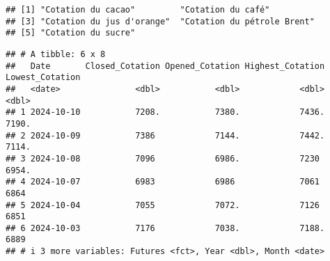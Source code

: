 \documentclass[
]{article}
\newenvironment{Shaded}{\begin{snugshade}}{\end{snugshade}}
\newcommand{\CommentTok}[1]{\textcolor[rgb]{0.56,0.35,0.01}{\textit{#1}}}
\newcommand{\FunctionTok}[1]{\textcolor[rgb]{0.13,0.29,0.53}{\textbf{#1}}}
\newcommand{\NormalTok}[1]{#1}
\newcommand{\OtherTok}[1]{\textcolor[rgb]{0.56,0.35,0.01}{#1}}
\newcommand{\SpecialCharTok}[1]{\textcolor[rgb]{0.81,0.36,0.00}{\textbf{#1}}}
\newcommand{\StringTok}[1]{\textcolor[rgb]{0.31,0.60,0.02}{#1}}
\begin{document}
\begin{Shaded}
\end{Shaded}

\begin{verbatim}
## [1] "Cotation du cacao"         "Cotation du café"         
## [3] "Cotation du jus d'orange"  "Cotation du pétrole Brent"
## [5] "Cotation du sucre"
\end{verbatim}

\begin{Shaded}
\end{Shaded}

\begin{verbatim}
## # A tibble: 6 x 8
##   Date       Closed_Cotation Opened_Cotation Highest_Cotation Lowest_Cotation
##   <date>               <dbl>           <dbl>            <dbl>           <dbl>
## 1 2024-10-10           7208.           7380.            7436.           7190.
## 2 2024-10-09           7386            7144.            7442.           7114.
## 3 2024-10-08           7096            6986.            7230            6954.
## 4 2024-10-07           6983            6986             7061            6864 
## 5 2024-10-04           7055            7072.            7126            6851 
## 6 2024-10-03           7176            7038.            7188.           6889 
## # i 3 more variables: Futures <fct>, Year <dbl>, Month <date>
\end{verbatim}
\end{document}
